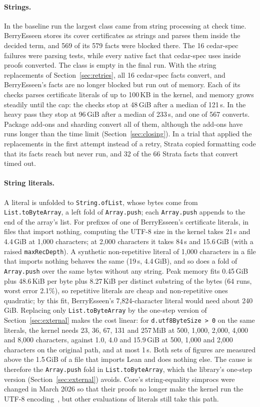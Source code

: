 \documentclass[11pt]{article}
\begin{document}
\paragraph{Strings.} In the baseline run the largest class came from string processing at check time.
BerryEsseen stores its cover certificates as strings and parses them inside the decided term, and 569 of its
579 facts were blocked there. The 16 cedar-spec failures were parsing tests, while every native fact that
cedar-spec uses inside proofs converted. The class is empty in the final run. With the string replacements of
Section~\ref{sec:retries}, all 16 cedar-spec facts convert, and BerryEsseen's facts are no longer blocked but
run out of memory. Each of its checks parses certificate literals of up to 100\,KB in the kernel, and memory
grows steadily until the cap: the checks stop at 48\,GiB after a median of 121\,s. In the heavy pass they stop
at 96\,GiB after a median of 233\,s, and one of 567 converts. Package add-ons and sharding convert all of them,
although the add-ons have runs longer than the time limit (Section~\ref{sec:closing}). In a trial that applied the replacements in the first attempt instead of a retry,
Strata copied formatting code that its facts reach but never run, and 32 of the 66 Strata facts that convert
timed out.

\paragraph{String literals.} A literal is unfolded to \texttt{String.ofList}, whose bytes come
from \texttt{List.\allowbreak toByteArray}, a left fold of \texttt{Array.push}; each \texttt{Array.push}
appends to the end of the array's list. For prefixes of one of BerryEsseen's certificate literals,
in files that import nothing, computing the UTF-8 size in the kernel takes 21\,s and 4.4\,GiB at 1,000
characters; at 2,000 characters it takes 84\,s and 15.6\,GiB (with a raised \texttt{maxRecDepth}). A synthetic non-repetitive literal of 1,000
characters in a file that imports nothing behaves the same (19\,s, 4.4\,GiB), and so does a fold of
\texttt{Array.push} over the same bytes without any string. Peak memory fits 0.45\,GiB plus
48.6\,KiB per byte plus 8.27\,KiB per distinct substring of the bytes (64 runs, worst error 2.1\%),
so repetitive literals are cheap and non-repetitive ones quadratic; by this fit, BerryEsseen's
7,824-character literal would need about 240\,GiB. Replacing only \texttt{List.toByteArray} by the one-step
version of Section~\ref{sec:external} makes the cost linear: for
\texttt{d.utf8ByteSize > 0} on the same literals, the kernel needs 23, 36, 67, 131 and 257\,MiB at
500, 1,000, 2,000, 4,000 and 8,000 characters, against 1.0, 4.0 and 15.9\,GiB at 500, 1,000 and
2,000 characters on the original path, and at most 1\,s. Both sets of figures are measured above the
1.5\,GiB of a file that imports Lean and does nothing else. The cause is therefore the
\texttt{Array.push} fold in \texttt{List.toByteArray}, which the library's one-step version
(Section~\ref{sec:external}) avoids. Core's string-equality simprocs were changed in March 2026 so that their
proofs no longer make the kernel run the UTF-8 encoding~\cite{pr12887}, but other evaluations of literals still
take this path.
\end{document}
